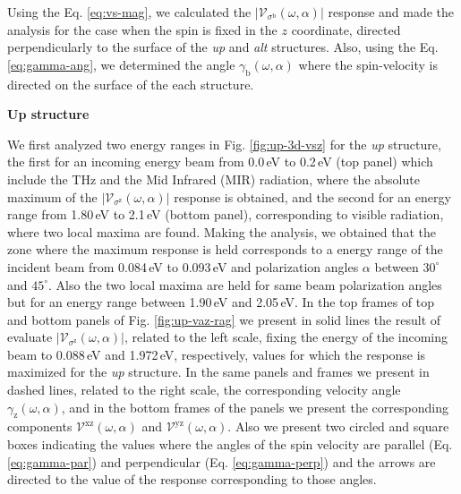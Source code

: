 \documentclass[prb,11pt,tightenlines,twocolumn,aps]{revtex4-1}
\begin{document}

{\color{red} Using the Eq. \eqref{eq:vs-mag}, we calculated the
$|\mathcal{V}_{\sigma^{\mathrm{b}}}(\omega,\alpha)|$ response and made the
analysis for the case when the spin is fixed in the $z$ coordinate, directed
perpendicularly to the surface of the \emph{up} and \emph{alt} structures. Also,
using the Eq. \eqref{eq:gamma-ang}, we determined the angle
$\gamma_{\mathrm{b}}(\omega,\alpha)$ where the spin-velocity is directed on the
surface of the each structure.}
% 

\textbf{Up structure}

We first analyzed two energy ranges in Fig. \ref{fig:up-3d-vsz} for the
\emph{up} structure, the first for an incoming energy beam from 0.0\,eV to
0.2\,eV (top panel)  which include the THz and the Mid Infrared (MIR) radiation,
where the absolute maximum of the
$|\mathcal{V}_{\sigma^{\mathrm{z}}}(\omega,\alpha)|$ response is obtained, and
the second for an energy range from 1.80\,eV to 2.1\,eV (bottom panel),
corresponding to visible radiation, where two local maxima are found.
% 
Making the analysis, we obtained that the zone where the maximum response is
held corresponds to a energy range of the incident beam from 0.084\,eV to
0.093\,eV and polarization angles $\alpha$ between $30^{\circ}$ and
$45^{\circ}$. Also the two local maxima are held for same beam polarization
angles but for an energy range between 1.90\,eV and 2.05\,eV.
In the top frames of top and bottom panels of Fig. \ref{fig:up-vaz-rag} we
present in solid lines the result of evaluate
$|\mathcal{V}_{\sigma^{\mathrm{z}}}(\omega,\alpha)|$, related to the left scale,
fixing the energy of the incoming beam to 0.088\,eV and 1.972\,eV, respectively,
values for which the response is maximized for the \emph{up} structure. In the
same panels and frames we present in dashed lines, related to the right scale,
the corresponding velocity angle $\gamma_{\mathrm{z}}(\omega,\alpha)$, and in
the bottom frames of the panels we present the corresponding components
$\mathcal{V}^{\mathrm{xz}}(\omega,\alpha)$ and
$\mathcal{V}^{\mathrm{yz}}(\omega,\alpha)$. Also we present two circled and
square boxes indicating the values where the angles of the spin velocity are
parallel (Eq. \ref{eq:gamma-par}) and perpendicular (Eq. \ref{eq:gamma-perp})
and the arrows are directed to the value of the response corresponding to those
angles.
\end{document}
